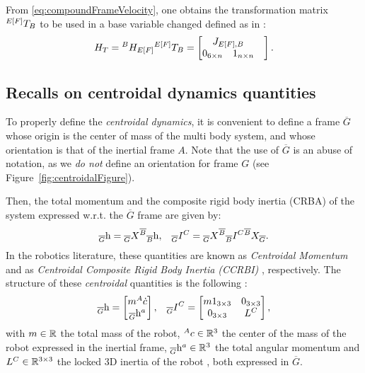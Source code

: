 From \eqref{eq:compoundFrameVelocity}, one obtains the transformation matrix $\hspace{0em}^{E[F]} T_{B}$ to be used in a base variable changed defined as in :
\begin{equation}
H_T = \ls^B H_{E[F]} \\ 
\ls^{E[F]} T_{B} =
\begin{bmatrix}
\multicolumn{2}{c}{J_{E[F],B}} & \\
0_{6 \times n} & 1_{n \times n} 
\end{bmatrix}.
\end{equation}


\subsection{Recalls on centroidal dynamics quantities}
To properly define the \emph{centroidal dynamics}, it is convenient to define a frame $\overline{G}$ whose origin is the center of mass of the multi body system, and whose orientation is that of the inertial frame $A$.
Note that the use of $\overline{G}$ is an abuse of notation, as we \emph{do not} define an orientation for frame $G$ (see Figure~\ref{fig:centroidalFigure}).

Then, the total  momentum and the composite rigid body inertia (CRBA) of the system expressed w.r.t. the $\overline{G}$ frame are given by: 
\begin{align}
\label{eq:centroidalMomentum}
\hspace{0em}_{\overline{G}} {\rm h} = \hspace{0em}_{\overline{G}} X^{\overline{B}} \hspace{0em}_{\overline{B}} {\rm h}, && \hspace{0em}_{\overline{G}} I^C = \hspace{0em}_{\overline{G}} X^{\overline{B}} \hspace{0em}_{\overline{B}} I^C  \hspace{0em}^{\overline{B}} X_{\overline{G}}.
\end{align}
In the robotics literature, these quantities are known as  \emph{Centroidal Momentum} and as \emph{Centroidal Composite Rigid Body Inertia (CCRBI)}  \citep{Orin2013}, respectively.
The structure of these \emph{centroidal} quantities is the following \citep{Orin2013} :
\begin{align}
\label{eq:centroidalMomentumStructure}
\hspace{0em}_{\overline{G}} {\rm h} = 
\begin{bmatrix}
m \hspace{0em}^A \dot{c} \\
\hspace{0em}_{\overline{G}} {\rm h}^a
\end{bmatrix},
&& 
\hspace{0em}_{\overline{G}} I^C = 
\begin{bmatrix}
m 1_{3\times3} & 0_{3\times3} \\
0_{3\times3}   & L^C
\end{bmatrix},
\end{align}
with $m \in \mathbb{R}$ the total mass of the robot, $\hspace{0em}^A c \in \mathbb{R}^3$ the center of the mass of the robot expressed in the inertial frame, $\hspace{0em}_{\overline{G}} {\rm h}^a \in \mathbb{R}^3$ the total angular momentum and $L^C \in \mathbb{R}^{3\times3}$ the locked 3D inertia of the robot , both expressed in $\overline{G}$.


